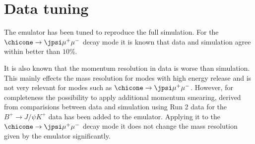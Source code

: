 \section{Data tuning}
\label{sec:data}
%
The emulator has been tuned to reproduce the full simulation. For the
$\chicone \rightarrow \jpsi \mu^+ \mu^-$ decay mode it is known that 
data and simulation agree within better than $10 \%$. 

 It is also known that the momentum resolution
in data is worse than simulation. This mainly effects the mass resolution for
modes with high energy release and is not very relevant for modes such
as $\chicone \rightarrow \jpsi \mu^+ \mu^-$. However, for completeness the
possibility to apply additional momentum smearing, derived from
comparisions between data and simulation using Run 2 data for the $B^+
\rightarrow J/\psi K^+$ data has been added to the emulator. Applying
it to the $\chicone \rightarrow \jpsi \mu^+ \mu^-$ decay mode it does not change
the mass resolution given by the emulator significantly.